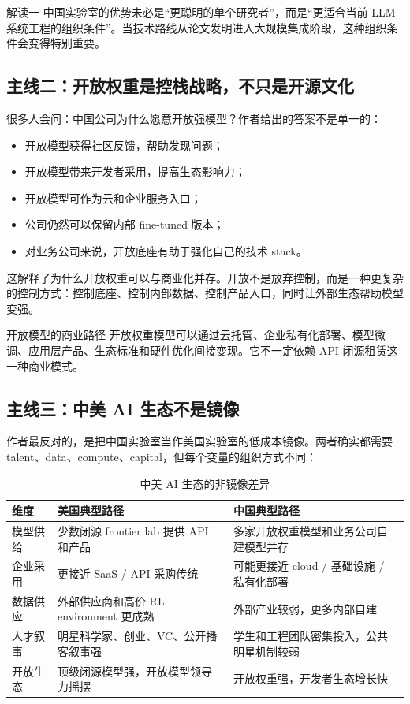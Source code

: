\documentclass[a4paper]{article}
\begin{document}
\begin{importantbox}{解读一}
中国实验室的优势未必是``更聪明的单个研究者''，而是``更适合当前 LLM 系统工程的组织条件''。当技术路线从论文发明进入大规模集成阶段，这种组织条件会变得特别重要。
\end{importantbox}

\subsection{主线二：开放权重是控栈战略，不只是开源文化}

很多人会问：中国公司为什么愿意开放强模型？作者给出的答案不是单一的：

\begin{itemize}[leftmargin=1.5em]
    \item 开放模型获得社区反馈，帮助发现问题；
    \item 开放模型带来开发者采用，提高生态影响力；
    \item 开放模型可作为云和企业服务入口；
    \item 公司仍然可以保留内部 fine-tuned 版本；
    \item 对业务公司来说，开放底座有助于强化自己的技术 stack。
\end{itemize}

这解释了为什么开放权重可以与商业化并存。开放不是放弃控制，而是一种更复杂的控制方式：控制底座、控制内部数据、控制产品入口，同时让外部生态帮助模型变强。

\begin{knowledgebox}{开放模型的商业路径}
开放权重模型可以通过云托管、企业私有化部署、模型微调、应用层产品、生态标准和硬件优化间接变现。它不一定依赖 API 闭源租赁这一种商业模式。
\end{knowledgebox}

\subsection{主线三：中美 AI 生态不是镜像}

作者最反对的，是把中国实验室当作美国实验室的低成本镜像。两者确实都需要 talent、data、compute、capital，但每个变量的组织方式不同：

\begin{table}[H]
\centering
\caption{中美 AI 生态的非镜像差异}
\begin{tabular}{@{}p{3.1cm}p{5.4cm}p{5.4cm}@{}}
\toprule
\textbf{维度} & \textbf{美国典型路径} & \textbf{中国典型路径} \\
\midrule
模型供给 & 少数闭源 frontier lab 提供 API 和产品 & 多家开放权重模型和业务公司自建模型并存 \\
企业采用 & 更接近 SaaS / API 采购传统 & 可能更接近 cloud / 基础设施 / 私有化部署 \\
数据供应 & 外部供应商和高价 RL environment 更成熟 & 外部产业较弱，更多内部自建 \\
人才叙事 & 明星科学家、创业、VC、公开播客叙事强 & 学生和工程团队密集投入，公共明星机制较弱 \\
开放生态 & 顶级闭源模型强，开放模型领导力摇摆 & 开放权重强，开发者生态增长快 \\
\bottomrule
\end{tabular}
\end{table}
\end{document}
